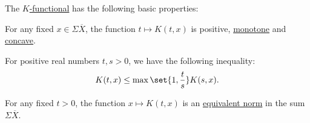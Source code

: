 \begin{proposition}\label{def:k_functional_properties}
  The \hyperref[def:k_functional]{\( K \)-functional} has the following basic properties:

  \begin{thmenum}
     For any fixed \( x \in \Sigma \overline{X} \), the function \( t \mapsto K(t, x) \) is positive, \hyperref[def:order_homomorphism]{monotone} and \hyperref[def:convex_functions]{concave}.

     For positive real numbers \( t, s > 0 \), we have the following inequality:
    \begin{equation}\label{eq:def:k_functional_properties/inequality}
      K(t, x) \leq \max\set{1, \frac t s} K(s, x).
    \end{equation}

     For any fixed \( t > 0 \), the function \( x \mapsto K(t, x) \) is an \hyperref[def:equivalent_metrics]{equivalent norm} in the sum \( \Sigma \overline{X} \).
  \end{thmenum}
\end{proposition}
